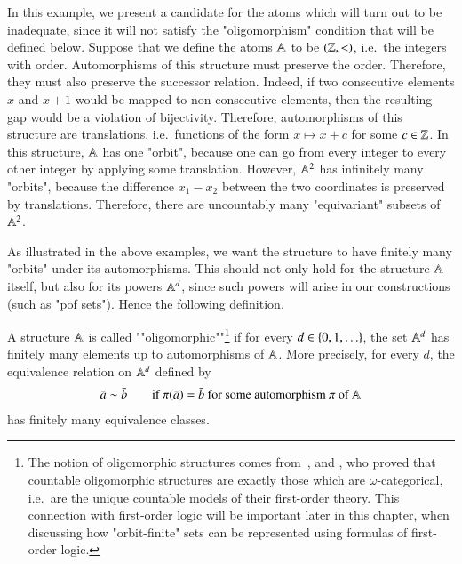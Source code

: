 \begin{myexample}\label{ex:integers-with-order} In this example, we present a candidate for the atoms which will turn out to be inadequate, since it will not satisfy the "oligomorphism" condition that will be defined below.
	Suppose that we define the atoms $\mathbb A$ to be   $({\mathbb Z},<)$, i.e.~the integers with order. Automorphisms of this structure must preserve the order. Therefore, they must also preserve the successor relation. Indeed, if two consecutive elements $x$ and $x+1$ would be mapped to non-consecutive elements, then the resulting gap would be a violation of bijectivity. Therefore, automorphisms of this structure are  translations, i.e.~functions of the form $x \mapsto x + c$ for some $c \in {\mathbb Z}$. In this structure, $\mathbb A$ has one "orbit", because one can go from every integer to every other integer by applying some translation. However, $\mathbb A^2$ has infinitely many "orbits", because the difference $x_1-x_2$ between the two coordinates is preserved by translations. Therefore, there are uncountably many "equivariant" subsets of $\mathbb A^2$.
\end{myexample}

As illustrated in the above examples, we want the structure to have finitely many "orbits" under its automorphisms. This should not only hold for the structure $\mathbb A$  itself, but also for its powers $\mathbb A^d$, since such powers will arise in our constructions (such as "pof sets"). Hence the following definition. 


\begin{definition}\label{def:structure-assumptions} A structure $\mathbb A$ is called ""oligomorphic""\footnote{The notion of oligomorphic structures comes from~\cite{ryll1959categoricity}, \cite{engeler1959characterization} and \cite{svenonius1959no}, who proved that countable oligomorphic structures are exactly those which are $\omega$-categorical, i.e.~are the unique countable models of their first-order theory. This connection with first-order logic will be important later in this  chapter, when discussing how "orbit-finite" sets can be represented using formulas of first-order logic. } if for every $d \in \{0,1,\ldots\}$, the set $\mathbb A^d$ has finitely many elements up to automorphisms of $\mathbb A$. More precisely, for every $ d$, the equivalence relation on $\mathbb A^d$ defined by
		\begin{align*}
		 \bar a \sim \bar b \qquad \mbox{if } \pi(\bar a) = \bar b \mbox{ for some automorphism $\pi$ of $\mathbb A$}
		\end{align*}
		has finitely many equivalence classes.
\end{definition}	



